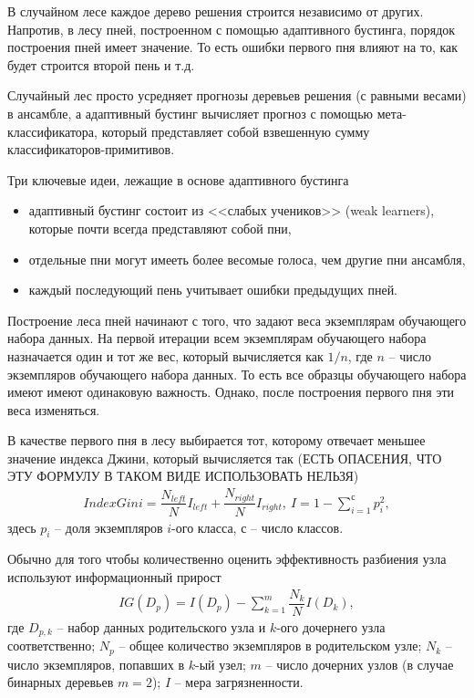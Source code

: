 \documentclass[%
	11pt,
	a4paper,
	utf8,
		]{article}
\begin{document}
В случайном лесе каждое дерево решения строится независимо от других. Напротив, в лесу пней, построенном с помощью адаптивного бустинга, порядок построения пней имеет значение. То есть ошибки первого пня влияют на то, как будет строится второй пень и т.д.

Случайный лес просто усредняет прогнозы деревьев решения (с равными весами) в ансамбле, а адаптивный бустинг вычисляет прогноз с помощью мета-классификатора, который представляет собой взвешенную сумму классификаторов-примитивов.

Три ключевые идеи, лежащие в основе адаптивного бустинга
\begin{itemize}
	\item адаптивный бустинг состоит из <<слабых учеников>> (weak learners), которые почти всегда представляют собой пни,
	
	\item отдельные пни могут имееть более весомые голоса, чем другие пни ансамбля,
	
	\item каждый последующий пень учитывает ошибки предыдущих пней.
\end{itemize}

Построение леса пней начинают с того, что задают веса экземплярам обучающего набора данных. На первой итерации всем экземплярам обучающего набора назначается один и тот же вес, который вычисляется как $ 1/n $, где $ n $ -- число экземпляров обучающего набора данных. То есть все образцы обучающего набора имеют имеют одинаковую важность. Однако, после построения первого пня эти веса изменяться.

В качестве первого пня в лесу выбирается тот, которому отвечает меньшее значение индекса Джини, который вычисляется так (ЕСТЬ ОПАСЕНИЯ, ЧТО ЭТУ ФОРМУЛУ В ТАКОМ ВИДЕ ИСПОЛЬЗОВАТЬ НЕЛЬЗЯ)
\begin{align*}
	Index Gini = \dfrac{N_{left}}{N} I_{left} + \dfrac{N_{right}}{N} I_{right},\ I = 1 - \sum_{i=1}^{с} p_i^2,
\end{align*}
здесь $ p_i $ -- доля экземпляров $ i $-ого класса, $ с $ -- число классов.

Обычно для того чтобы количественно оценить эффективность разбиения узла используют информационный прирост
\begin{align*}
	IG(D_p) = I(D_p) - \sum_{k=1}^{m} \dfrac{N_k}{N} I(D_k),
\end{align*}
где $ D_{p,k} $ -- набор данных родительского узла и $ k $-ого дочернего узла соответственно; $ N_p $ -- общее количество экземпляров в родительском узле; $ N_k $ -- число экземпляров, попавших в $ k $-ый узел; $ m $ -- число дочерних узлов (в случае бинарных деревьев $ m = 2 $); $ I $ -- мера загрязненности.
\end{document}
